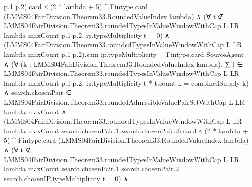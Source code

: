 \documentclass[10pt]{article}
\begin{document}
\begin{ReviewVerbatim}
                                            p.1 p.2).card ≤
                                        (2 * lambda + 5) ^
                                          Fintype.card (LMMS04FairDivision.Theorem33.RoundedValueIndex lambda) ∧
                                      (∀
                                          t ∉
                                            LMMS04FairDivision.Theorem33.roundedTypesInValueWindowWithCap L LR lambda
                                              maxCount p.1 p.2,
                                          ip.typeMultiplicity t = 0) ∧
                                        (LMMS04FairDivision.Theorem33.roundedTypesInValueWindowWithCap L LR lambda
                                                  maxCount p.1 p.2).sum
                                              ip.typeMultiplicity =
                                            Fintype.card SourceAgent ∧
                                          (∀ (k : LMMS04FairDivision.Theorem33.RoundedValueIndex lambda),
                                              ∑
                                                  t ∈
                                                    LMMS04FairDivision.Theorem33.roundedTypesInValueWindowWithCap L LR
                                                      lambda maxCount p.1 p.2,
                                                  ip.typeMultiplicity t * t.count k =
                                                combinedSupply k) ∧
                                            search.chosenPair ∈
                                                LMMS04FairDivision.Theorem33.roundedAdmissibleValuePairSetWithCap L LR
                                                  lambda maxCount ∧
                                              (LMMS04FairDivision.Theorem33.roundedTypesInValueWindowWithCap L LR lambda
                                                      maxCount search.chosenPair.1 search.chosenPair.2).card ≤
                                                  (2 * lambda + 5) ^
                                                    Fintype.card
                                                      (LMMS04FairDivision.Theorem33.RoundedValueIndex lambda) ∧
                                                (∀
                                                    t ∉
                                                      LMMS04FairDivision.Theorem33.roundedTypesInValueWindowWithCap L LR
                                                        lambda maxCount search.chosenPair.1 search.chosenPair.2,
                                                    search.chosenIP.typeMultiplicity t = 0) ∧

\end{ReviewVerbatim}
\end{document}
